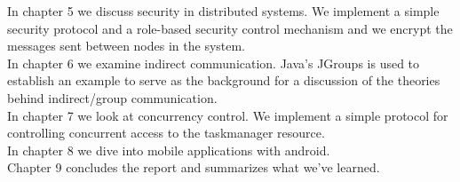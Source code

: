 In chapter 5 we discuss security in distributed systems. We implement a simple security protocol and a role-based security control mechanism and we encrypt the messages sent between nodes in the system. \\

In chapter 6 we examine indirect communication. Java's JGroups is used to establish an example to serve as the background for a discussion of the theories behind indirect/group communication. \\

In chapter 7 we look at concurrency control. We implement a simple protocol for controlling concurrent access to the taskmanager resource.\\

In chapter 8 we dive into mobile applications with android. \\

Chapter 9 concludes the report and summarizes what we've learned.\\

